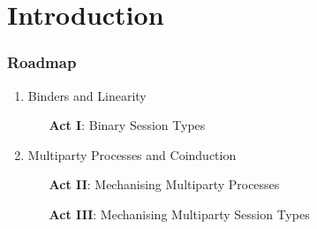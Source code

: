 \section{Introduction}

\begin{frame}
\frametitle{Roadmap}
\begin{center}
\begin{enumerate}
\item Binders and Linearity
\begin{itemize}
\item[\textbf{Act I}:] Binary Session Types
\end{itemize}
\item Multiparty Processes and Coinduction
  \begin{itemize}
  \item[\textbf{Act II}:] Mechanising Multiparty Processes
  \item[\textbf{Act III}:] Mechanising Multiparty Session Types
  \end{itemize}
\end{enumerate}
\end{center}
\end{frame}


